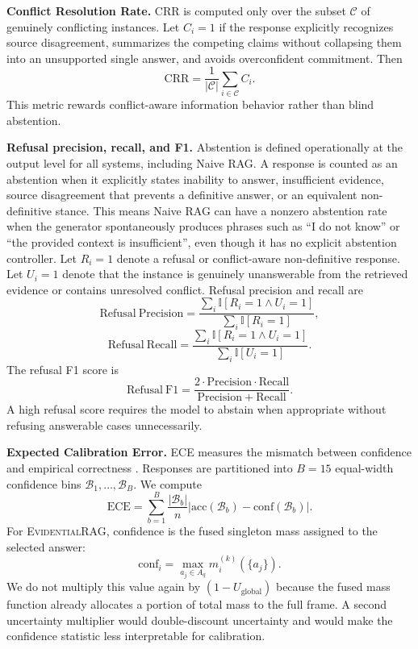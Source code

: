 \documentclass[preprint,12pt,authoryear,nopreprintline]{elsarticle}
\newcommand{\ERAG}{\textsc{EvidentialRAG}}
\begin{document}
\textbf{Conflict Resolution Rate.} CRR is computed only over the subset $\mathcal{C}$ of genuinely conflicting instances. Let $C_i=1$ if the response explicitly recognizes source disagreement, summarizes the competing claims without collapsing them into an unsupported single answer, and avoids overconfident commitment. Then
\begin{equation}
    \mathrm{CRR}=\frac{1}{|\mathcal{C}|}\sum_{i\in\mathcal{C}}C_i.
\end{equation}
This metric rewards conflict-aware information behavior rather than blind abstention.

\textbf{Refusal precision, recall, and F1.} Abstention is defined operationally at the output level for all systems, including Naive RAG. A response is counted as an abstention when it explicitly states inability to answer, insufficient evidence, source disagreement that prevents a definitive answer, or an equivalent non-definitive stance. This means Naive RAG can have a nonzero abstention rate when the generator spontaneously produces phrases such as ``I do not know'' or ``the provided context is insufficient'', even though it has no explicit abstention controller. Let $R_i=1$ denote a refusal or conflict-aware non-definitive response. Let $U_i=1$ denote that the instance is genuinely unanswerable from the retrieved evidence or contains unresolved conflict. Refusal precision and recall are
\begin{equation}
    \mathrm{Refusal\ Precision}=\frac{\sum_i \mathbb{I}[R_i=1\land U_i=1]}{\sum_i \mathbb{I}[R_i=1]},
\end{equation}
\begin{equation}
    \mathrm{Refusal\ Recall}=\frac{\sum_i \mathbb{I}[R_i=1\land U_i=1]}{\sum_i \mathbb{I}[U_i=1]}.
\end{equation}
The refusal F1 score is
\begin{equation}
    \mathrm{Refusal\ F1}=\frac{2\cdot \mathrm{Precision}\cdot \mathrm{Recall}}{\mathrm{Precision}+\mathrm{Recall}}.
\end{equation}
A high refusal score requires the model to abstain when appropriate without refusing answerable cases unnecessarily.

\textbf{Expected Calibration Error.} ECE measures the mismatch between confidence and empirical correctness \citep{Guo2017Calibration}. Responses are partitioned into $B=15$ equal-width confidence bins $\mathcal{B}_1,\ldots,\mathcal{B}_B$. We compute
\begin{equation}
    \mathrm{ECE}=\sum_{b=1}^{B}\frac{|\mathcal{B}_b|}{n}\left|\mathrm{acc}(\mathcal{B}_b)-\mathrm{conf}(\mathcal{B}_b)\right|.
\end{equation}
For \ERAG{}, confidence is the fused singleton mass assigned to the selected answer:
\begin{equation}
    \mathrm{conf}_i=\max_{a_j\in A_q}m^{(k)}_i(\{a_j\}).
\end{equation}
We do not multiply this value again by $(1-U_{\mathrm{global}})$ because the fused mass function already allocates a portion of total mass to the full frame. A second uncertainty multiplier would double-discount uncertainty and would make the confidence statistic less interpretable for calibration.
\end{document}
